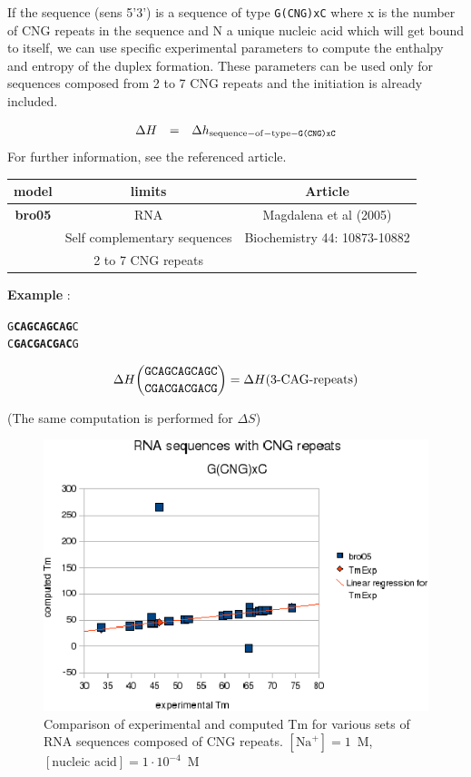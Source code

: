 \documentclass{article}
\begin{document}
If the sequence (sens 5'3') is a sequence of type \texttt{G(CNG)xC} where x is the number of CNG repeats in
the sequence and N a unique nucleic acid which will get bound to itself, we can use specific
experimental parameters to compute the enthalpy and entropy of the duplex formation. These parameters can be used
only for sequences composed from 2 to 7 CNG repeats and the initiation is already included.
 
\begin{displaymath}
  \begin{array}[t]{ccc}
  \Delta{}H&=&\Delta{}h_\mathrm{sequence-of-type-\texttt{G(CNG)xC}}\\
  \end{array}
\end{displaymath}
For further information, see the referenced article.

\begin{table}[hc]
\begin{tabular}[h]{| c | c | c |}
\textbf{model} & \textbf{limits} & \textbf{Article} \\
 \hline
\textbf{bro05} & RNA & Magdalena et al (2005) \\
 & Self complementary sequences & Biochemistry 44: 10873-10882\\
 & 2 to 7 CNG repeats & \\
 \hline
\end{tabular}
\end{table}


\textbf{Example} :
\begin{alltt}
G\textbf{CAGCAGCAG}C
C\textbf{GACGACGAC}G
\end{alltt}

\begin{multline*}
\Delta H {\mbox{\texttt{GCAGCAGCAGC}} \choose \mbox{\texttt{CGACGACGACG}}} = 
\Delta H {(\mbox{3-CAG-repeats})}
\end{multline*}

       (The same computation is performed for $\Delta S$)

\begin{figure}[h]
\includegraphics[width=1\linewidth]{images/CNG}
\caption{Comparison of experimental and computed Tm for various sets of
 RNA sequences composed of CNG repeats. $[\mbox{Na}^+] = 1$~M, $[\mbox{nucleic acid}] = 1\cdot{}10^{-4}$~M}
\end{figure}
\end{document}
